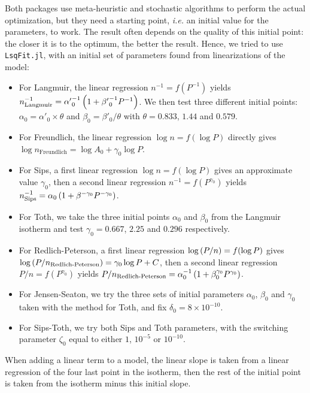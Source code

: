 \documentclass[main.tex]{subfiles}
\begin{document}
Both packages use meta-heuristic and stochastic algorithms to perform the actual optimization, but they need a starting point, \textit{i.e.} an initial value for the parameters, to work. The result often depends on the quality of this initial point: the closer it is to the optimum, the better the result. Hence, we tried to use \texttt{LsqFit.jl}, with an initial set of parameters found from linearizations of the model:
\begin{itemize}
	\item For Langmuir, the linear regression $n^{-1} = f(P^{-1})$
	 yields $n_\text{Langmuir}^{-1} = {\alpha'}_0^{-1}\left(1 + {\beta'}_0^{-1}P^{-1}\right)$. 
	 We then test three different initial points: $\alpha_0 = \alpha'_0\times\theta$
	  and $\beta_0 = \beta'_0/\theta$ 
	  with $\theta = 0.833$, $1.44$ and $0.579$.
	\item For Freundlich, the linear regression $\log n = f(\log P)$ directly gives $\log n_\text{Freundlich} = \log A_0 + \gamma_0\log P$.
	\item For Sips, a first linear regression $\log n = f(\log P)$ gives an approximate value $\gamma_0$, then a second linear regression $n^{-1} = f(P^{\gamma_0})$ yields $n_\text{Sips}^{-1} = \alpha_0\left(1 + \beta^{-\gamma_0}P^{-\gamma_0}\right)$.
	\item For Toth, we take the three initial points $\alpha_0$ and $\beta_0$ from the Langmuir isotherm and test $\gamma_0 = 0.667$, $2.25$ and $0.296$ respectively.
	\item For Redlich-Peterson, a first linear regression $\log\left(P/n\right) = f(\log P)$ gives $\log\left(P/n_\text{Redlich-Peterson}\right) = \gamma_0\log P + C$, then a second linear regression $P/n = f(P^{\gamma_0})$ yields $P/n_\text{Redlich-Peterson} = \alpha_0^{-1}\left(1 + \beta_0^{\gamma_0}P^{\gamma_0}\right)$.
	\item For Jensen-Seaton, we try the three sets of initial parameters $\alpha_0$, $\beta_0$ and $\gamma_0$ taken with the method for Toth, and fix $\delta_0 = 8\times10^{-10}$.
	\item For Sips-Toth, we try both Sips and Toth parameters, with the switching parameter $\zeta_0$ equal to either $1$, $10^{-5}$ or $10^{-10}$.
\end{itemize}

When adding a linear term to a model, the linear slope is taken from a linear regression of the four last point in the isotherm, then the rest of the initial point is taken from the isotherm minus this initial slope.
\end{document}
